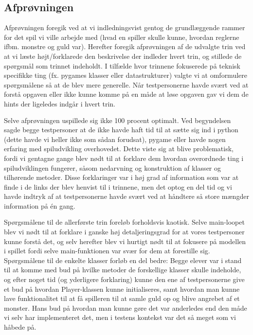\documentclass[10pt,a4paper,danish]{article}
\begin{document}
\subsection{Afprøvningen}
Afprøvningen foregik ved at vi indledningsvist gentog de grundlæggende rammer for det
spil vi ville arbejde med (hvad en spiller skulle kunne, 
hvordan reglerne ifbm. monstre og guld var). Herefter foregik afprøvningen af de
udvalgte trin ved at vi læste højt/forklarede den beskrivelse der indleder hvert 
trin, og stillede de spørgsmål som trinnet indeholdt. I tilfælde hvor trinnene
fokuserede på teknisk specifikke ting (fx. pygames klasser eller datastrukturer) 
valgte vi at omformulere spørgsmålene så at de blev mere generelle. Når testpersonerne havde
svært ved at forstå opgaven eller ikke kunne komme på en måde at løse opgaven
gav vi dem de hints der ligeledes indgår i hvert trin. 

Selve afprøvningen uspillede sig ikke 100 procent optimalt. Ved begyndelsen sagde
begge testpersoner at de ikke havde haft tid til at sætte sig 
ind i python (dette havde vi heller ikke som sådan forudsat), pygame eller havde nogen 
erfaring med spiludvikling overhovedet. Dette viste sig at blive problematisk, fordi 
vi gentagne gange blev nødt til at forklare dem hvordan overordnede ting i spiludviklingen
fungerer, såsom nedarvning og konstruktion af klasser og tilhørende metoder. Disse forklaringer
var i høj grad af information som var at finde i de links der blev henvist til i trinnene, 
men det optog en del tid og vi havde indtryk af at testpersonerne havde svært ved at 
håndtere så store mængder information på én gang. 

Spørgsmålene til de allerførste trin foreløb forholdsvis kaotisk. Selve main-loopet
blev vi nødt til at forklare i ganske høj detaljeringsgrad for at vores testpersoner
kunne forstå det, og selv herefter blev vi hurtigt nødt til at fokusere på modellen
i spillet fordi selve main-funktionen var svær for dem at forestille sig. Spørgsmålene
til de enkelte klasser forløb en del bedre: Begge elever var i stand til at komme med 
bud på hvilke metoder de forskellige klasser skulle indeholde, og efter noget tid (og
yderligere forklaring) kunne den ene af testpersonerne give et bud på hvordan Player-klassen
kunne initialiseres, samt hvordan man kunne lave funktionalitet til at få spilleren 
til at samle guld op og blive angrebet af et monster. Hans bud på hvordan man kunne gøre 
det var anderledes end den måde vi selv har implementeret det, men i testens kontekst
var det så meget som vi håbede på.
\end{document}
